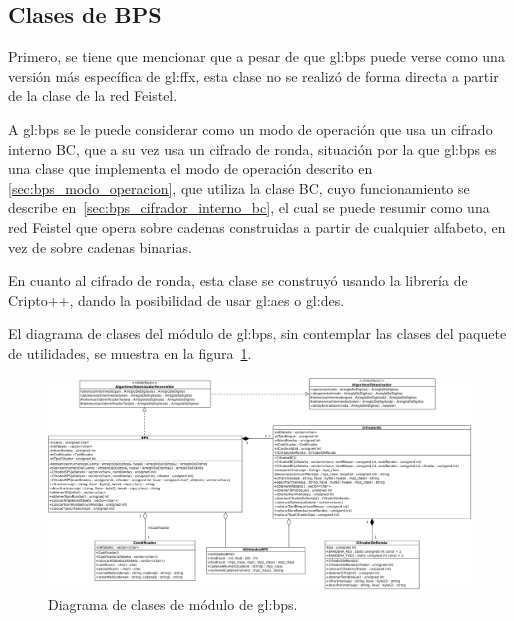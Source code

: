 %
%
%

\subsection{Clases de BPS}

Primero, se tiene que mencionar que a pesar de que \gls{gl:bps} puede verse como
una versión más específica de \gls{gl:ffx}, esta clase no se realizó de forma
directa a partir de la clase de la red Feistel.

A \gls{gl:bps} se le puede considerar como un modo de operación que usa un
cifrado interno BC, que a su vez usa un cifrado de ronda, situación por la que
\gls{gl:bps} es una clase que implementa el modo de operación descrito en
\ref{sec:bps_modo_operacion}, que utiliza la clase BC, cuyo funcionamiento se
describe en~\ref{sec:bps_cifrador_interno_bc}, el cual se puede resumir como
una red Feistel que opera sobre cadenas construidas a partir de cualquier
alfabeto, en vez de sobre cadenas binarias.

En cuanto al cifrado de ronda, esta clase se construyó usando la librería de
Cripto++, dando la posibilidad de usar \gls{gl:aes} o \gls{gl:des}.


El diagrama de clases del módulo de \gls{gl:bps}, sin contemplar las clases del
paquete de utilidades, se muestra en la figura~\ref{diagrama_clases_bps}.

\begin{figure}
  \begin{center}
    \includegraphics[width=1.0\linewidth]{diagramas/bps.png}
    \caption{Diagrama de clases de módulo de \gls{gl:bps}.}
    \label{diagrama_clases_bps}
  \end{center}
\end{figure}
